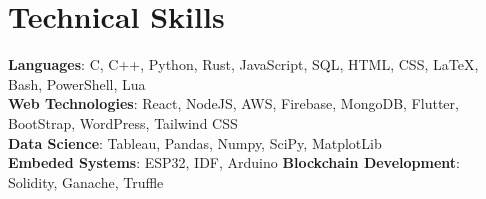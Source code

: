 \documentclass[letterpaper,11pt]{article}
\begin{document}
%
\section{Technical Skills}
\begin{itemize}[leftmargin=0.15in, label={}]
  \small{\item{
                \textbf{Languages}{: C, C++, Python, Rust, JavaScript, SQL, HTML, CSS, {\LaTeX}, Bash, PowerShell, Lua} \\
                \textbf{Web Technologies}{: React, NodeJS, AWS, Firebase, MongoDB, Flutter, BootStrap, WordPress, Tailwind CSS} \\
                \textbf{Data Science}{: Tableau, Pandas, Numpy, SciPy, MatplotLib} \\
                \textbf{Embeded Systems}{: ESP32, IDF, Arduino}
                \hspace{1em}
                \textbf{Blockchain Development}{: Solidity, Ganache, Truffle} \\
          }}
\end{itemize}
\vspace{-16pt}
\end{document}
